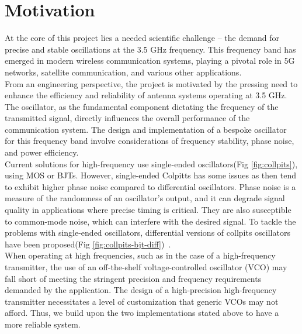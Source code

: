 \documentclass[]{extarticle}
\begin{document}
\newpage
\section{Motivation}

At the core of this project lies a needed scientific challenge – the demand for precise and stable oscillations at the 3.5 GHz frequency. This frequency band has emerged in modern wireless communication systems, playing a pivotal role in 5G networks, satellite communication, and various other applications.\\

From an engineering perspective, the project is motivated by the pressing need to enhance the efficiency and reliability of antenna systems operating at 3.5 GHz. The oscillator, as the fundamental component dictating the frequency of the transmitted signal, directly influences the overall performance of the communication system. The design and implementation of a bespoke oscillator for this frequency band involve considerations of frequency stability, phase noise, and power efficiency.\\

Current solutions for high-frequency use single-ended oscillators(Fig \ref{fig:collpits}), using MOS or BJTs. However, single-ended Colpitts has some issues as then tend to exhibit higher phase noise compared to differential oscillators. Phase noise is a measure of the randomness of an oscillator's output, and it can degrade signal quality in applications where precise timing is critical. They are also susceptible to common-mode noise, which can interfere with the desired signal. To tackle the problems with single-ended oscillators, differential versions of collpits oscillators have been proposed(Fig \ref{fig:collpits-bjt-diff})~\cite{article}. \\ 

When operating at high frequencies, such as in the case of a high-frequency transmitter, the use of an off-the-shelf voltage-controlled oscillator (VCO) may fall short of meeting the stringent precision and frequency requirements demanded by the application. The design of a high-precision high-frequency transmitter necessitates a level of customization that generic VCOs may not afford. Thus, we build upon the two implementations stated above to have a more reliable system.
\end{document}
